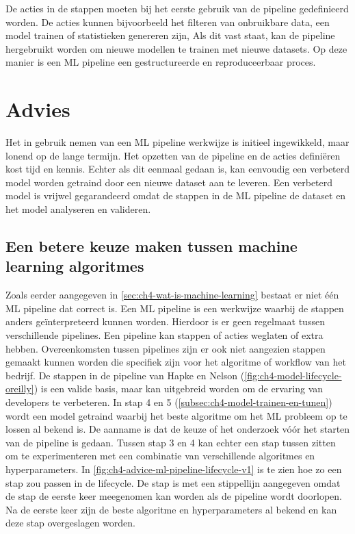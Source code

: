 De acties in de stappen moeten bij het eerste gebruik van de pipeline gedefinieerd worden. De acties kunnen bijvoorbeeld het filteren van onbruikbare data, een model trainen of statistieken genereren zijn, Als dit vast staat, kan de pipeline hergebruikt worden om nieuwe modellen te trainen met nieuwe datasets. Op deze manier is een ML pipeline een gestructureerde en reproduceerbaar proces.

\section{Advies}\label{sec:ch4-advies}
Het in gebruik nemen van een ML pipeline werkwijze is initieel ingewikkeld, maar lonend op de lange termijn. Het opzetten van de pipeline en de acties definiëren kost tijd en kennis. Echter als dit eenmaal gedaan is, kan eenvoudig een verbeterd model worden getraind door een nieuwe dataset aan te leveren. Een verbeterd model is vrijwel gegarandeerd omdat de stappen in de ML pipeline de dataset en het model analyseren en valideren.

\subsection{Een betere keuze maken tussen machine learning algoritmes}\label{subsec:ch4-een-betere-keuze-maken-tussen-machine-learning-algoritmes}
Zoals eerder aangegeven in \autoref{sec:ch4-wat-is-machine-learning} bestaat er niet één ML pipeline dat correct is. Een ML pipeline is een werkwijze waarbij de stappen anders geïnterpreteerd kunnen worden. Hierdoor is er geen regelmaat tussen verschillende pipelines. Een pipeline kan stappen of acties weglaten of extra hebben. Overeenkomsten tussen pipelines zijn er ook niet aangezien stappen gemaakt kunnen worden die specifiek zijn voor het algoritme of workflow van het bedrijf. De stappen in de pipeline van Hapke en Nelson (\autoref{fig:ch4-model-lifecycle-oreilly}) is een valide basis, maar kan uitgebreid worden om de ervaring van developers te verbeteren. In stap 4 en 5 (\autoref{subsec:ch4-model-trainen-en-tunen}) wordt een model getraind waarbij het beste algoritme om het ML probleem op te lossen al bekend is. De aanname is dat de keuze of het onderzoek vóór het starten van de pipeline is gedaan. Tussen stap 3 en 4 kan echter een stap tussen zitten om te experimenteren met een combinatie van verschillende algoritmes en hyperparameters. In \autoref{fig:ch4-advice-ml-pipeline-lifecycle-v1} is te zien hoe zo een stap zou passen in de lifecycle. De stap is met een stippellijn aangegeven omdat de stap de eerste keer meegenomen kan worden als de pipeline wordt doorlopen. Na de eerste keer zijn de beste algoritme en hyperparameters al bekend en kan deze stap overgeslagen worden.

